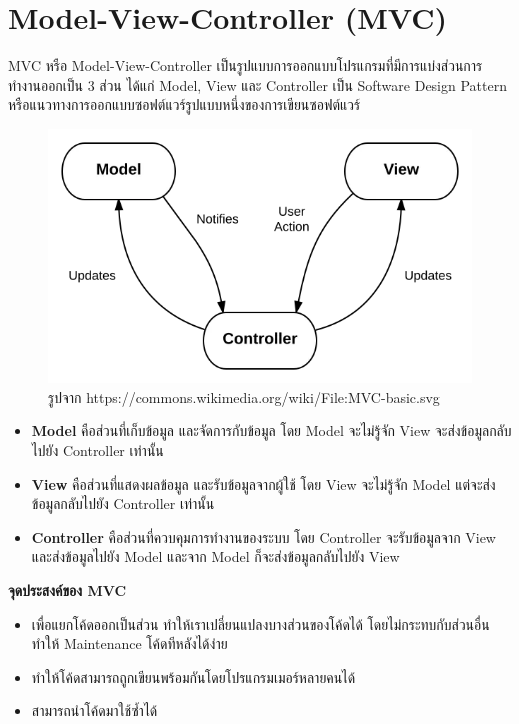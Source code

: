 \section{Model-View-Controller (MVC)}
\hspace{1.27cm}MVC หรือ Model-View-Controller\cite{mvc} เป็นรูปแบบการออกแบบโปรแกรมที่มีการแบ่งส่วนการทำงานออกเป็น 3 ส่วน ได้แก่ Model, View และ Controller เป็น Software Design Pattern หรือแนวทางการออกแบบซอฟต์แวร์รูปแบบหนึ่งของการเขียนซอฟต์แวร์

\begin{figure}[H]
  \centering
  \includegraphics[width=\linewidth, keepaspectratio]{pictures/mvc.png}
  \caption[Model View Controller]{รูปจาก https://commons.wikimedia.org/wiki/File:MVC-basic.svg}
  \label{fig:mvc}
  
\end{figure}
\begin{itemize}
  \item \textbf{Model} คือส่วนที่เก็บข้อมูล และจัดการกับข้อมูล โดย Model จะไม่รู้จัก View จะส่งข้อมูลกลับไปยัง Controller เท่านั้น
  \item \textbf{View} คือส่วนที่แสดงผลข้อมูล และรับข้อมูลจากผู้ใช้ โดย View จะไม่รู้จัก Model แต่จะส่งข้อมูลกลับไปยัง Controller เท่านั้น
  \item \textbf{Controller} คือส่วนที่ควบคุมการทำงานของระบบ โดย Controller จะรับข้อมูลจาก View และส่งข้อมูลไปยัง Model และจาก Model ก็จะส่งข้อมูลกลับไปยัง View
\end{itemize}
\textbf{จุดประสงค์ของ MVC}
\begin{itemize}
  \item เพื่อแยกโค้ดออกเป็นส่วน ทำให้เราเปลี่ยนแปลงบางส่วนของโค้ดได้ โดยไม่กระทบกับส่วนอื่น ทำให้ Maintenance โค้ดทีหลังได้ง่าย
  \item ทำให้โค้ดสามารถถูกเขียนพร้อมกันโดยโปรแกรมเมอร์หลายคนได้
  \item สามารถนำโค้ดมาใช้ซ้ำได้
\end{itemize}


